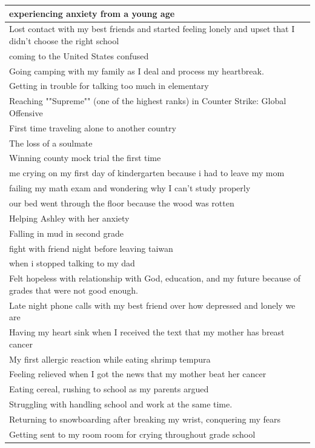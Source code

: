 \documentclass[
  .7em,
  letterpaper,
  DIV=11,
  numbers=noendperiod]{scrartcl}
\begin{document}
\begin{table}
\begin{tabular}{l}
\hline
experiencing anxiety from a young age\\
\hline
Lost contact with my best friends and started feeling lonely and upset that I didn't choose the right school\\
\hline
coming to the United States confused\\
\hline
Going camping with my family as I deal and process my heartbreak.\\
\hline
Getting in trouble for talking too much in elementary\\
\hline
Reaching ""Supreme"" (one of the highest ranks) in Counter Strike: Global Offensive\\
\hline
First time traveling alone to another country\\
\hline
The loss of a soulmate\\
\hline
Winning county mock trial the first time\\
\hline
me crying on my first day of kindergarten because i had to leave my mom\\
\hline
failing my math exam and wondering why I can't study properly\\
\hline
our bed went through the floor because the wood was rotten\\
\hline
Helping Ashley with her anxiety\\
\hline
Falling in mud in second grade\\
\hline
fight with friend night before leaving taiwan\\
\hline
when i stopped talking to my dad\\
\hline
Felt hopeless with relationship with God, education, and my future because of grades that were not good enough.\\
\hline
Late night phone calls with my best friend over how depressed and lonely we are\\
\hline
Having my heart sink when I received the text that my mother has breast cancer\\
\hline
My first allergic reaction while eating shrimp tempura\\
\hline
Feeling relieved when I got the news that my mother beat her cancer\\
\hline
Eating cereal, rushing to school as my parents argued\\
\hline
Struggling with handling school and work at the same time.\\
\hline
Returning to snowboarding after breaking my wrist, conquering my fears\\
\hline
Getting sent to my room room for crying throughout grade school\\

\end{tabular}
\end{table}
\end{document}
